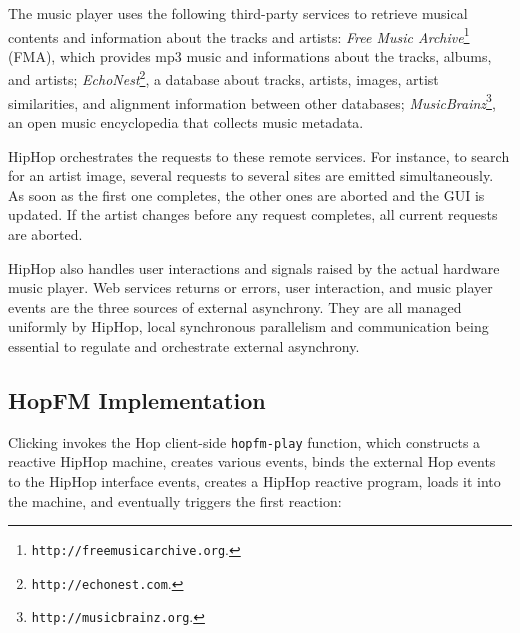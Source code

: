 \documentclass{llncs}
\begin{document}
The music player uses the following third-party services to retrieve
musical contents and information about the tracks and artists:
{\em Free Music Archive}\footnote{{\texttt{http://freemusicarchive.org}}.}
(FMA), which
provides mp3 music and informations about the tracks, albums, and
artists;
{\em EchoNest}\footnote{{\texttt{http://echonest.com}}.}, a
database about tracks, artists, images, artist similarities, and alignment information
between other databases; 
{\em MusicBrainz}\footnote{{\texttt{http://musicbrainz.org}}.}, an open music encyclopedia
 that collects music metadata.

HipHop orchestrates the requests to these remote services. For
instance, to search for an artist image, several requests to several
sites are emitted simultaneously. As soon as the first one completes,
the other ones are aborted and the GUI is updated. If the artist
changes before any request completes, all current requests are
aborted.

HipHop also handles user interactions and signals raised by
the actual hardware music player. Web services returns or errors, user
interaction, and music player events are the three sources of
external asynchrony. They are all managed
uniformly by HipHop, local synchronous parallelism and communication being
essential to regulate and orchestrate external asynchrony.

\subsection{HopFM Implementation}
\label{HopFM}

Clicking
{\textbf{{\footnotesize{{\footnotesize{}}}}}} invokes
the Hop client-side {\texttt{hopfm-play}} function, which
constructs a reactive HipHop machine, creates various events, binds
the external Hop events to the HipHop interface events,
creates a HipHop reactive program, loads it into the machine, and
eventually triggers the first reaction:
\end{document}
